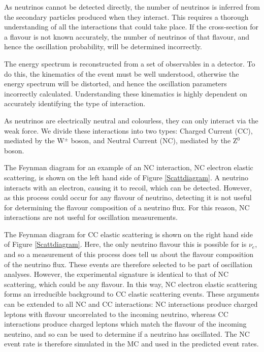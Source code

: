 As neutrinos cannot be detected directly, the number of neutrinos is inferred from the secondary particles produced when they interact. This requires a thorough understanding of all the interactions that could take place. If the cross-section for a flavour is not known accurately, the number of neutrinos of that flavour, and hence the oscillation probability, will be determined incorrectly.

The energy spectrum is reconstructed from a set of observables in a detector. To do this, the kinematics of the event must be well understood, otherwise the  energy spectrum will be distorted, and hence the oscillation parameters incorrectly calculated. Understanding these kinematics is highly dependent on accurately identifying the type of interaction. 

As neutrinos are electrically neutral and colourless, they can only interact via the weak force. We divide these interactions into two types: Charged Current (CC), mediated by the W$^\pm$ boson, and Neutral Current (NC), mediated by the Z$^0$ boson.

The Feynman diagram for an example of an NC interaction, NC electron elastic scattering, is shown on the left hand side of Figure \ref{Scattdiagram}. A neutrino interacts with an electron, causing it to recoil, which can be detected. However, as this process could occur for any flavour of neutrino, detecting it is not useful for determining the flavour composition of a neutrino flux. For this reason, NC interactions are not useful for oscillation measurements.

The Feynman diagram for CC elastic scattering is shown on the right hand side of Figure \ref{Scattdiagram}. Here, the only neutrino flavour this is possible for is $\nu_e$, and so a measurement of this process does tell us about the flavour composition of the neutrino flux. These events are therefore selected to be part of oscillation analyses. However, the experimental signature is identical to that of NC scattering, which could be any flavour. In this way, NC electron elastic scattering forms an irreducible background to CC elastic scattering events. These arguments can be extended to all NC and CC interactions: NC interactions produce charged leptons with flavour uncorrelated to the incoming neutrino, whereas CC interactions produce charged leptons which match the flavour of the incoming neutrino, and so can be used to determine if a neutrino has oscillated. The NC event rate is therefore simulated in the MC and used in the predicted event rates. 

